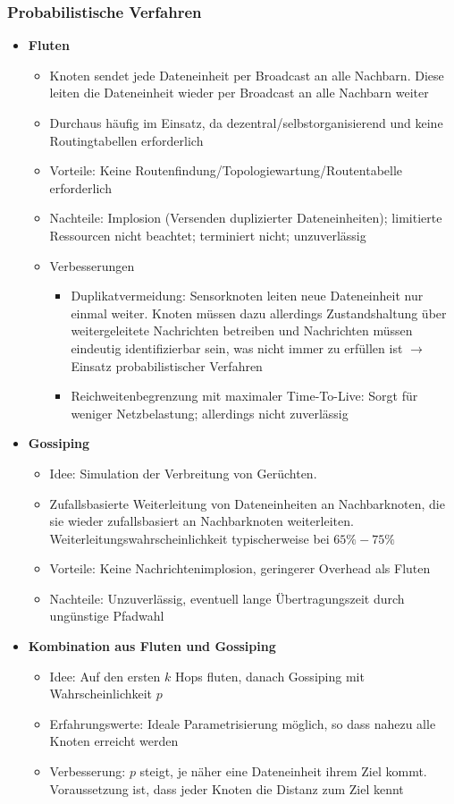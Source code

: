 \subsubsection{Probabilistische Verfahren}
\begin{itemize}
	\item \textbf{Fluten}
	\begin{itemize}
		\item Knoten sendet jede Dateneinheit per Broadcast an alle Nachbarn. Diese leiten die Dateneinheit wieder per Broadcast an alle Nachbarn weiter
		\item Durchaus häufig im Einsatz, da dezentral/selbstorganisierend und keine Routingtabellen erforderlich
		\item Vorteile: Keine Routenfindung/Topologiewartung/Routentabelle erforderlich
		\item Nachteile: Implosion (Versenden duplizierter Dateneinheiten); limitierte Ressourcen nicht beachtet; terminiert nicht; unzuverlässig
		\item Verbesserungen
		\begin{itemize}
			\item Duplikatvermeidung: Sensorknoten leiten neue Dateneinheit nur einmal weiter. Knoten müssen dazu allerdings Zustandshaltung über weitergeleitete Nachrichten betreiben und Nachrichten müssen eindeutig identifizierbar sein, was nicht immer zu erfüllen ist \(\rightarrow\) Einsatz probabilistischer Verfahren
			\item Reichweitenbegrenzung mit maximaler Time-To-Live: Sorgt für weniger Netzbelastung; allerdings nicht zuverlässig
		\end{itemize}
	\end{itemize}
	\item \textbf{Gossiping}
	\begin{itemize}
		\item Idee: Simulation der Verbreitung von Gerüchten. 
		\item Zufallsbasierte Weiterleitung von Dateneinheiten an Nachbarknoten, die sie wieder zufallsbasiert an Nachbarknoten weiterleiten. Weiterleitungswahrscheinlichkeit typischerweise bei \(65\%-75\%\)
		\item Vorteile: Keine Nachrichtenimplosion, geringerer Overhead als Fluten
		\item Nachteile: Unzuverlässig, eventuell lange Übertragungszeit durch ungünstige Pfadwahl
	\end{itemize}
	\item \textbf{Kombination aus Fluten und Gossiping}
	\begin{itemize}
		\item Idee: Auf den ersten \(k\) Hops fluten, danach Gossiping mit Wahrscheinlichkeit \(p\)
		\item Erfahrungswerte: Ideale Parametrisierung möglich, so dass nahezu alle Knoten erreicht werden
		\item Verbesserung: \(p\) steigt, je näher eine Dateneinheit ihrem Ziel kommt. Voraussetzung ist, dass jeder Knoten die Distanz zum Ziel kennt
	\end{itemize}
\end{itemize}


